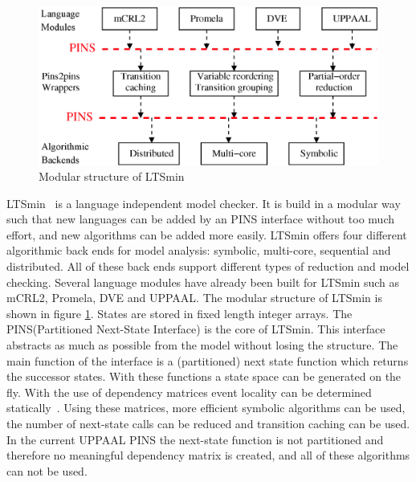 \documentclass[11pt]{article}
\begin{document}
\begin{figure}[t] 
\includegraphics[width=\textwidth]{pins_modern}
\caption{Modular structure of LTSmin}
\label{fig:pins_modern}
\end{figure}

LTSmin~\cite{eemcs18152,ltsmin-mc:nmf2011} is a language independent model checker. It is build in a modular way such that new languages can be added by an PINS interface without too much effort, and new algorithms can be added more easily. LTSmin offers four different algorithmic back ends for model analysis: symbolic, multi-core, sequential and distributed. All of these back ends support different types of reduction and model checking. Several language modules have already been built for LTSmin such as mCRL2, Promela, DVE and UPPAAL. The modular structure of LTSmin is shown in figure \ref{fig:pins_modern}. States are stored in fixed length integer arrays. The PINS(Partitioned Next-State Interface) is the core of LTSmin. This interface abstracts as much as possible from the model without losing the structure. The main function of the interface is a (partitioned) next state function which returns the successor states. With these functions a state space can be generated on the fly. With the use of dependency matrices event locality can be determined statically~\cite{rwcmatrices}. Using these matrices, more efficient symbolic algorithms can be used, the number of next-state calls can be reduced and transition caching can be used. In the current UPPAAL PINS the next-state function is not partitioned and therefore no meaningful dependency matrix is created, and all of these algorithms can not be used.
\end{document}
